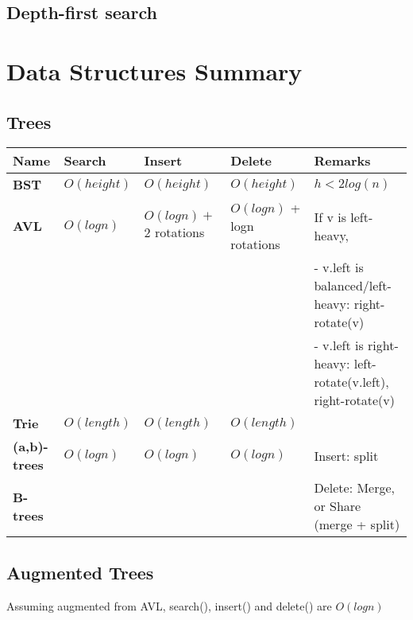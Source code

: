 \documentclass{article}
\begin{document}
    \pagebreak

    \subsection{Depth-first search}



    \pagebreak

    \section{Data Structures Summary}

    \subsection{Trees}

    \noindent\begin{tabular}{|l|l|l|l|p{5cm}|}
        \toprule
        \textbf{Name} & \textbf{Search} & \textbf{Insert} & \textbf{Delete} & \textbf{Remarks}\\
        \midrule
        \midrule
        \textbf{BST} & $O(height)$ & $O(height)$ & $O(height)$ & $h < 2log(n)$\\
        \midrule
        \textbf{AVL} & $O(logn)$ & $O(logn) +$ 2 rotations & $O(logn)$ + logn rotations & If v is left-heavy,\\
        &&&&- v.left is balanced/left-heavy: right-rotate(v)\\
        &&&&- v.left is right-heavy: left-rotate(v.left), right-rotate(v)\\
        \midrule
        \textbf{Trie} & $O(length)$ & $O(length)$& $O(length)$ &\\
        \midrule
        \textbf{(a,b)-trees} & $O(logn)$ & $O(logn)$ & $O(logn)$ & Insert: split\\
        \textbf{B-trees} &&&& Delete: Merge, or Share (merge + split)\\
        \bottomrule
    \end{tabular}

    \subsection{Augmented Trees}

    Assuming augmented from AVL, search(), insert() and delete() are $O(logn)$\\
\end{document}
